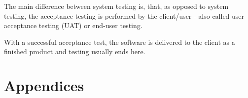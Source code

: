 \documentclass[11pt,a4paper,oneside,svgnames]{report}
\begin{document}
The main difference between system testing is, that, as opposed to system testing, the acceptance testing is performed by the client/user - also called user acceptance testing (UAT) or end-user testing.

With a successful acceptance test, the software is delivered to the client as a finished product and testing usually ends here.


\chapter{Appendices}
\printglossaries{}

\listoffigures{}
\listoftables{}
\end{document}
